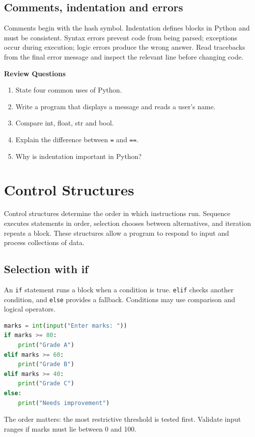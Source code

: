 \documentclass[11pt,openany,oneside]{book}
\newcommand{\reviewtitle}{\par\noindent\textbf{\color{Navy}Review Questions}\par}
\begin{document}
\section{Comments, indentation and errors}
Comments begin with the hash symbol. Indentation defines blocks in Python and must be consistent. Syntax errors prevent code from being parsed; exceptions occur during execution; logic errors produce the wrong answer. Read tracebacks from the final error message and inspect the relevant line before changing code.

\reviewtitle
\begin{enumerate}
\item State four common uses of Python.
\item Write a program that displays a message and reads a user's name.
\item Compare int, float, str and bool.
\item Explain the difference between \texttt{=} and \texttt{==}.
\item Why is indentation important in Python?
\end{enumerate}

\chapter{Control Structures}
Control structures determine the order in which instructions run. Sequence executes statements in order, selection chooses between alternatives, and iteration repeats a block. These structures allow a program to respond to input and process collections of data.

\section{Selection with if}
An \texttt{if} statement runs a block when a condition is true. \texttt{elif} checks another condition, and \texttt{else} provides a fallback. Conditions may use comparison and logical operators.

\begin{lstlisting}[style=webcode,language=Python]
marks = int(input("Enter marks: "))
if marks >= 80:
    print("Grade A")
elif marks >= 60:
    print("Grade B")
elif marks >= 40:
    print("Grade C")
else:
    print("Needs improvement")
\end{lstlisting}
The order matters: the most restrictive threshold is tested first. Validate input ranges if marks must lie between 0 and 100.
\end{document}
